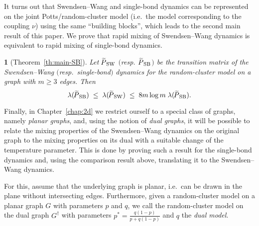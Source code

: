 \documentclass{dis}
\theoremstyle{citing}
\newtheorem{cit}{}
\begin{document}
It turns out that Swendsen--Wang and single-bond dynamics can be 
represented on the joint Potts/random-cluster model 
(i.e.~the model corresponding to the coupling $\nu$) using the same 
``building blocks'', which leads to the second main result of 
this paper. We prove that rapid mixing of 
Swendsen--Wang dynamics is equivalent to rapid mixing of single-bond dynamics. 

\begin{cit}[Theorem~\ref{th:main-SB}]
Let ${{\raisebox{2pt}{ ${\widetilde{{}}}$ }\mkern-14mu P}_{\rm SW}}$ $($resp.~${{\raisebox{2pt}{ ${\widetilde{{}}}$ }\mkern-14mu P}_{\rm SB}}$$)$ be the transition matrix of the 
Swendsen--Wang $($resp.~single-bond$)$ dynamics for the 
random-cluster model on a graph with $m\!\ge\!3$ edges. Then 
\[
\lambda({{\raisebox{2pt}{ ${\widetilde{{}}}$ }\mkern-14mu P}_{\rm SB}}) \;\le\; \lambda({{\raisebox{2pt}{ ${\widetilde{{}}}$ }\mkern-14mu P}_{\rm SW}}) \;\le\; 8 m \log m\; \lambda({{\raisebox{2pt}{ ${\widetilde{{}}}$ }\mkern-14mu P}_{\rm SB}}).
\]
\vspace{-1mm}
\end{cit}

Finally, in Chapter~\ref{chap:2d} we restrict ourself to a special 
class of graphs, namely \emph{planar graphs}, and, 
using the notion of \emph{dual graphs}, it will be possible 
to relate the mixing properties of the Swendsen--Wang dynamics 
on the original graph to the mixing properties on its dual with a 
suitable change of the temperature parameter. 
This is done by proving such a result for the single-bond dynamics 
and, using the comparison result above, translating it to the 
Swendsen--Wang dynamics. 

For this, assume that the underlying graph is planar, 
i.e.~can be drawn in the plane without intersecting edges.
Furthermore, given a random-cluster model on a planar graph $G$ 
with parameters $p$ and $q$, we call the random-cluster model 
on the dual graph $G^\dag$ with parameters 
$p^*=\frac{q(1-p)}{p+q(1-p)}$ and $q$ the \emph{dual model}.
\end{document}
